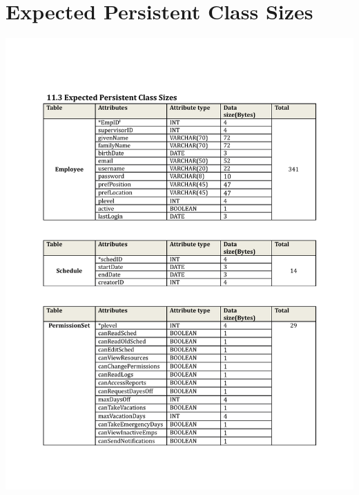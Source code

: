 \documentclass[letterpaper,12pt]{report}
\begin{document}
\chapter{Expected Persistent Class Sizes}
\newpage
\includegraphics[trim=30mm 20mm 25mm 30mm]{ExternalFiles/DocumentStuff/datasizes1.pdf}
\end{document}
